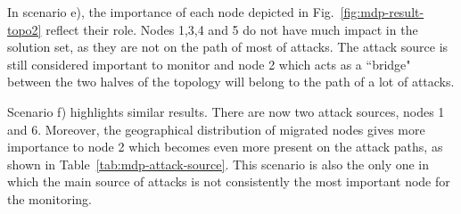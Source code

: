 In scenario e), the importance of each node depicted in Fig.~\ref{fig:mdp-result-topo2} reflect their role. Nodes 1,3,4 and 5 do not have much impact in the solution set, as they are not on the path of most of attacks. The attack source is still considered important to monitor and node 2 which acts as a ``bridge" between the two halves of the topology will belong to the path of a lot of attacks.

Scenario f) highlights similar results. There are now two attack sources, nodes 1 and 6. Moreover, the geographical distribution of migrated nodes gives more importance to node 2 which becomes even more present on the attack paths, as shown in Table~\ref{tab:mdp-attack-source}. This scenario is also the only one in which the main source of attacks is not consistently the most important node for the monitoring.








